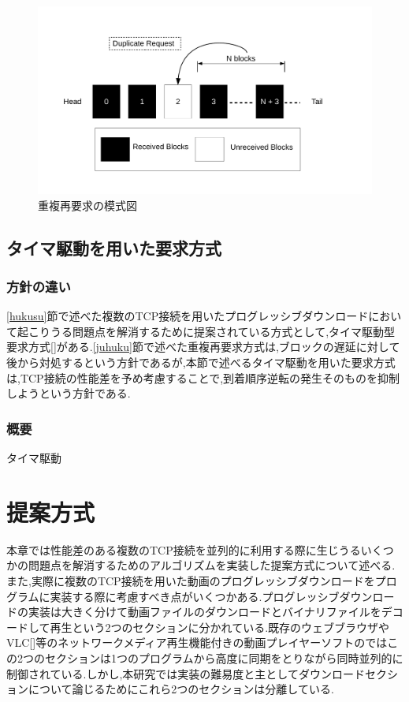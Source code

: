\documentclass[a4j,12pt]{gradthesis_utf8}
\begin{document}
 \begin{figure}[h]
     \centering
     \includegraphics[width=18cm]{block_dup.pdf}
     \caption{重複再要求の模式図}
     \label{blockdup}
 \end{figure}

\newpage
 
 
 \section{タイマ駆動を用いた要求方式}
 \subsection{方針の違い}
 \ref{hukusu}節で述べた複数のTCP接続を用いたプログレッシブダウンロードにおいて起こりうる問題点を解消するために提案されている方式として,タイマ駆動型要求方式[]がある.\ref{juhuku}節で述べた重複再要求方式は,ブロックの遅延に対して後から対処するという方針であるが,本節で述べるタイマ駆動を用いた要求方式は,TCP接続の性能差を予め考慮することで,到着順序逆転の発生そのものを抑制しようという方針である.
 \subsection{概要}
 タイマ駆動
 
\chapter{提案方式}\label{sec:sec3}
本章では性能差のある複数のTCP接続を並列的に利用する際に生じうるいくつかの問題点を解消するためのアルゴリズムを実装した提案方式について述べる.\\
また,実際に複数のTCP接続を用いた動画のプログレッシブダウンロードをプログラムに実装する際に考慮すべき点がいくつかある.プログレッシブダウンロードの実装は大きく分けて動画ファイルのダウンロードとバイナリファイルをデコードして再生という2つのセクションに分かれている.既存のウェブブラウザやVLC[]等のネットワークメディア再生機能付きの動画プレイヤーソフトのではこの2つのセクションは1つのプログラムから高度に同期をとりながら同時並列的に制御されている.しかし,本研究では実装の難易度と主としてダウンロードセクションについて論じるためにこれら2つのセクションは分離している.
\end{document}
